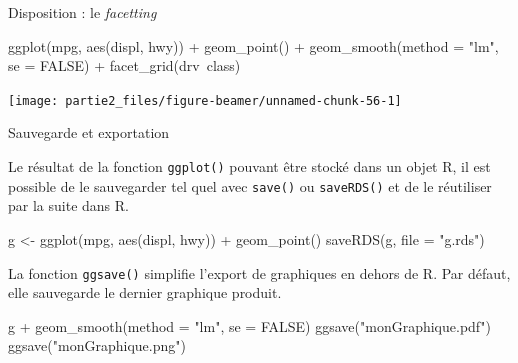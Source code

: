 \documentclass[12pt,ignorenonframetext,]{beamer}
\newenvironment{Shaded}{}{}
\newcommand{\DataTypeTok}[1]{#1}
\newcommand{\KeywordTok}[1]{\textcolor[rgb]{0.00,0.00,1.00}{#1}}
\newcommand{\NormalTok}[1]{#1}
\newcommand{\OperatorTok}[1]{#1}
\newcommand{\OtherTok}[1]{\textcolor[rgb]{1.00,0.25,0.00}{#1}}
\newcommand{\StringTok}[1]{\textcolor[rgb]{0.00,0.50,0.50}{#1}}
\renewenvironment{Shaded}{\begin{snugshade}}{\end{snugshade}}
\begin{document}
\begin{frame}[fragile]{Disposition : le \emph{facetting}}
\protect\hypertarget{disposition-le-facetting-1}{}

\footnotesize \center

\begin{Shaded}
\begin{Highlighting}[]
\KeywordTok{ggplot}\NormalTok{(mpg, }\KeywordTok{aes}\NormalTok{(displ, hwy)) }\OperatorTok{+}
\StringTok{  }\KeywordTok{geom_point}\NormalTok{() }\OperatorTok{+}\StringTok{ }\KeywordTok{geom_smooth}\NormalTok{(}\DataTypeTok{method =} \StringTok{"lm"}\NormalTok{, }\DataTypeTok{se =} \OtherTok{FALSE}\NormalTok{) }\OperatorTok{+}\StringTok{ }
\StringTok{  }\KeywordTok{facet_grid}\NormalTok{(drv}\OperatorTok{~}\NormalTok{class)}
\end{Highlighting}
\end{Shaded}

\texttt{[image: partie2\_files/figure-beamer/unnamed-chunk-56-1]}

\end{frame}

\begin{frame}[fragile]{Sauvegarde et exportation}
\protect\hypertarget{sauvegarde-et-exportation}{}

Le résultat de la fonction \texttt{ggplot()} pouvant être stocké dans un
objet R, il est possible de le sauvegarder tel quel avec \texttt{save()}
ou \texttt{saveRDS()} et de le réutiliser par la suite dans R.

\begin{Shaded}
\begin{Highlighting}[]
\NormalTok{g <-}\StringTok{ }\KeywordTok{ggplot}\NormalTok{(mpg, }\KeywordTok{aes}\NormalTok{(displ, hwy)) }\OperatorTok{+}\StringTok{ }\KeywordTok{geom_point}\NormalTok{()}
\KeywordTok{saveRDS}\NormalTok{(g, }\DataTypeTok{file =} \StringTok{"g.rds"}\NormalTok{)}
\end{Highlighting}
\end{Shaded}

\pause La fonction \texttt{ggsave()} simplifie l’export de graphiques en
dehors de R. Par défaut, elle sauvegarde le dernier graphique produit.

\begin{Shaded}
\begin{Highlighting}[]
\NormalTok{g }\OperatorTok{+}\StringTok{ }\KeywordTok{geom_smooth}\NormalTok{(}\DataTypeTok{method =} \StringTok{"lm"}\NormalTok{, }\DataTypeTok{se =} \OtherTok{FALSE}\NormalTok{)}
\KeywordTok{ggsave}\NormalTok{(}\StringTok{"monGraphique.pdf"}\NormalTok{)}
\KeywordTok{ggsave}\NormalTok{(}\StringTok{"monGraphique.png"}\NormalTok{)}
\end{Highlighting}
\end{Shaded}

\end{frame}
\end{document}
